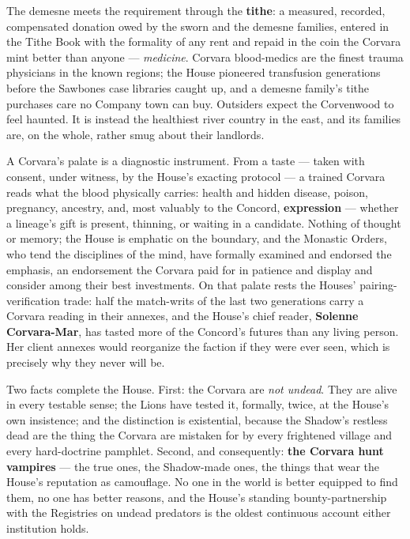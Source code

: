 The demesne meets the requirement through the \textbf{tithe}: a measured, recorded, compensated donation owed by the sworn and the demesne families, entered in the Tithe Book with the formality of any rent and repaid in the coin the Corvara mint better than anyone --- \textit{medicine}. Corvara blood-medics are the finest trauma physicians in the known regions; the House pioneered transfusion generations before the Sawbones case libraries caught up, and a demesne family's tithe purchases care no Company town can buy. Outsiders expect the Corvenwood to feel haunted. It is instead the healthiest river country in the east, and its families are, on the whole, rather smug about their landlords.

A Corvara's palate is a diagnostic instrument. From a taste --- taken with consent, under witness, by the House's exacting protocol --- a trained Corvara reads what the blood physically carries: health and hidden disease, poison, pregnancy, ancestry, and, most valuably to the Concord, \textbf{expression} --- whether a lineage's gift is present, thinning, or waiting in a candidate. Nothing of thought or memory; the House is emphatic on the boundary, and the Monastic Orders, who tend the disciplines of the mind, have formally examined and endorsed the emphasis, an endorsement the Corvara paid for in patience and display and consider among their best investments. On that palate rests the Houses' pairing-verification trade: half the match-writs of the last two generations carry a Corvara reading in their annexes, and the House's chief reader, \textbf{Solenne Corvara-Mar}, has tasted more of the Concord's futures than any living person. Her client annexes would reorganize the faction if they were ever seen, which is precisely why they never will be.

Two facts complete the House. First: the Corvara are \textit{not undead}. They are alive in every testable sense; the Lions have tested it, formally, twice, at the House's own insistence; and the distinction is existential, because the Shadow's restless dead are the thing the Corvara are mistaken for by every frightened village and every hard-doctrine pamphlet. Second, and consequently: \textbf{the Corvara hunt vampires} --- the true ones, the Shadow-made ones, the things that wear the House's reputation as camouflage. No one in the world is better equipped to find them, no one has better reasons, and the House's standing bounty-partnership with the Registries on undead predators is the oldest continuous account either institution holds.


